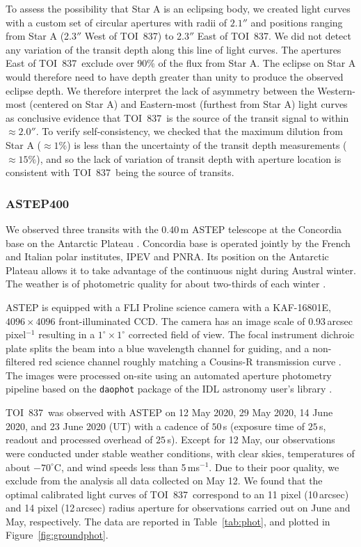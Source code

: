 \documentclass[12pt,twocolumn,tighten]{aastex63}
\newcommand{\tn}{TOI~837} %
\begin{document}
To assess the possibility that Star A is an eclipsing body, we created
light curves with a custom set of circular apertures with radii of
$2.1''$ and positions ranging from Star A (2.3$''$ West of \tn) to
2.3$''$ East of \tn.  We did not detect any variation of the transit
depth along this line of light curves. The apertures East of \tn\
exclude over 90\% of the flux from Star A.  The eclipse on Star A
would therefore need to have depth greater than unity to produce the
observed eclipse depth.  We therefore interpret the lack of asymmetry
between the Western-most (centered on Star A) and Eastern-most
(furthest from Star A) light curves as conclusive evidence that \tn\
is the source of the transit signal to within $\approx2.0''$.  To
verify self-consistency, we checked that the maximum dilution from
Star A ($\approx 1\%$) is less than the uncertainty of the transit
depth measurements ($\approx 15\%$), and so the lack of variation of
transit depth with aperture location is consistent with \tn\ being the
source of transits.



\subsubsection{ASTEP400}

We observed three transits with the 0.40$\,$m ASTEP telescope at the
Concordia base on the Antarctic Plateau \citep{daban_astep_2010}.
Concordia base is operated jointly by the French and Italian polar
institutes, IPEV and PNRA.  Its position on the Antarctic Plateau
allows it to take advantage of
the continuous night during Austral winter.  The weather is of
photometric quality for about two-thirds of each winter
\citep{crouzet_four_2018}.

ASTEP is equipped with a FLI Proline science camera with a KAF-16801E,
$4096\times4096$ front-illuminated CCD. The camera has an image scale
of 0.93\,arcsec pixel$^{-1}$ resulting in a $1^{\circ}\times1^{\circ}$
corrected field of view. The focal instrument dichroic plate splits
the beam into a blue wavelength channel for guiding, and a
non-filtered red science channel roughly matching a Cousins-R
transmission curve
\citep{abe_secondary_2013,mekarnia_transiting_2016}.  The images were
processed on-site using an automated aperture  photometry pipeline
based on the \texttt{daophot} package of the IDL astronomy user's
library \citep{landsman_1995}.

\tn\ was observed with ASTEP on 12 May 2020, 29 May 2020, 14 June
2020, and 23 June 2020 (UT) with a cadence of $50\,$s (exposure time
of $25\,$s, readout and processed overhead of $25\,$s).  Except for 12
May, our observations were conducted under stable weather conditions,
with clear skies, temperatures of about $-70^\circ$C, and wind speeds
less than 5\,ms$^{-1}$. Due to their poor quality, we exclude from
the analysis all data collected on May 12. We found that the optimal
calibrated light curves of \tn\ correspond to an 11 pixel (10\,arcsec)
and 14 pixel (12\,arcsec) radius aperture for observations carried out
on June and May, respectively.  The data are reported in
Table~\ref{tab:phot}, and plotted in Figure~\ref{fig:groundphot}.
\end{document}
